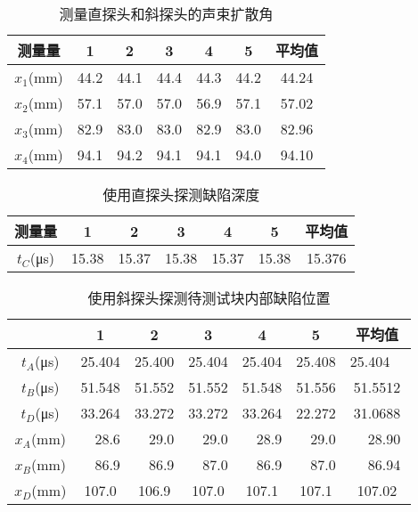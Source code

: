 \documentclass[a4paper,utf8]{article}
\begin{document}
\begin{table}[!ht]
    \caption{测量直探头和斜探头的声束扩散角}\label{tab:exp6}
    \begin{tabularx}{\textwidth}{*{7}{C}} \toprule
        测量量 & 1 & 2 & 3 & 4 & 5 & 平均值 \\ \midrule
        $x_1$(\unit{\mm}) & 44.2 & 44.1 & 44.4 & 44.3 & 44.2 & 44.24 \\ 
        $x_2$(\unit{\mm}) & 57.1 & 57.0 & 57.0 & 56.9 & 57.1 & 57.02 \\ 
        $x_3$(\unit{\mm}) & 82.9 & 83.0 & 83.0 & 82.9 & 83.0 & 82.96 \\ 
        $x_4$(\unit{\mm}) & 94.1 & 94.2 & 94.1 & 94.1 & 94.0 & 94.10 \\ \bottomrule
    \end{tabularx}
\end{table}

\begin{table}[!ht]
    \caption{使用直探头探测缺陷深度}\label{tab:exp7}
    \begin{tabularx}{\textwidth}{*{7}{C}} \toprule
        测量量 & 1 & 2 & 3 & 4 & 5 & 平均值 \\ \midrule
        $t_C$(\unit{\us}) & 15.38 & 15.37 & 15.38 & 15.37 & 15.38 & 15.376 \\ \bottomrule
    \end{tabularx}
\end{table}

\begin{table}[!ht]
    \caption{使用斜探头探测待测试块内部缺陷位置}\label{tab:exp8}
    \begin{tabularx}{\textwidth}{*{7}{C}} \toprule
        ~ & 1 & 2 & 3 & 4 & 5 & 平均值 \\ \midrule
        $t_A$(\unit{\us}) & 25.404 & 25.400 & 25.404 & 25.404 & 25.408 & 25.404~~{} \\
        $t_B$(\unit{\us}) & 51.548 & 51.552 & 51.552 & 51.548 & 51.556 & 51.5512 \\
        $t_D$(\unit{\us}) & 33.264 & 33.272 & 33.272 & 33.264 & 22.272 & 31.0688 \\[2mm]
        $x_A$(\unit{\mm}) & ~~28.6 & ~~29.0 & ~~29.0 & ~~28.9 & ~~29.0 & ~~28.90 \\
        $x_B$(\unit{\mm}) & ~~86.9 & ~~86.9 & ~~87.0 & ~~86.9 & ~~87.0 & ~~86.94 \\
        $x_D$(\unit{\mm}) & 107.0 & 106.9 & 107.0 & 107.1 & 107.1 & 107.02 \\
        \bottomrule
    \end{tabularx}
\end{table}

\end{document}
